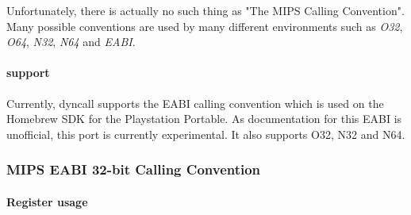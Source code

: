 Unfortunately, there is actually no such thing as "The MIPS Calling Convention".  Many possible conventions are used
by many different environments such as \emph{O32}\cite{MIPSo32}, \emph{O64}, \emph{N32}, \emph{N64} and \emph{EABI}.\\

\paragraph{ support}

Currently, dyncall supports the EABI calling convention which is used on the Homebrew SDK for the Playstation Portable.
As documentation for this EABI is unofficial, this port is currently experimental. It also supports O32, N32 and N64.

\subsubsection{MIPS EABI 32-bit Calling Convention}

\paragraph{Register usage}

